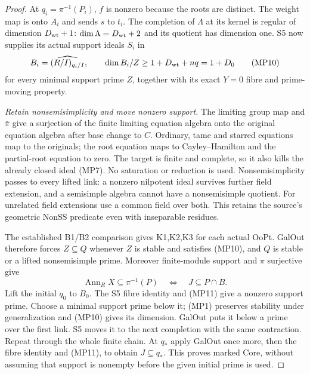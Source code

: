 \begin{proof}
At $q_i=\pi^{-1}(P_i)$, $f$ is nonzero because the roots are distinct.
The weight map is onto $A_i$ and sends $s$ to $t_i$.  The completion of
$\Lambda$ at its kernel is regular of dimension $D_{\rm wt}+1$:
$\dim\Lambda=D_{\rm wt}+2$ and its quotient has dimension one.
S5 now supplies its actual support ideals $S_i$ in
\[
 B_i=\widehat{(R/I)_{q_i/I}},\qquad
 \dim B_i/Z\ge 1+D_{\rm wt}+nq=1+D_0                         \tag{MP10}
\]
for every minimal support prime $Z$, together with its exact $Y=0$
fibre and prime-moving property.

\emph{Retain nonsemisimplicity and move nonzero support.}
The limiting group map and $\bar\pi$ give a surjection of the finite
limiting equation algebra onto the original equation algebra after
base change to $C$.  Ordinary, tame and starred equations map to the
originals; the root equation maps to Cayley--Hamilton and the
partial-root equation to zero.  The target is finite and complete,
so it also kills the already closed ideal (MP7).  No saturation or
reduction is used.  Nonsemisimplicity passes to every lifted link:
a nonzero nilpotent ideal survives further field extension, and a
semisimple algebra cannot have a nonsemisimple quotient.  For unrelated
field extensions use a common field over both.  This retains the
source's geometric NonSS predicate even with inseparable residues.

The established B1/B2 comparison gives K1,K2,K3 for each actual OoPt.
GalOut therefore forces $Z\subseteq Q$ whenever $Z$ is stable and
satisfies (MP10), and $Q$ is stable or a lifted nonsemisimple prime.
Moreover finite-module support and $\pi$ surjective give
\[
 \operatorname{Ann}_RX\subseteq\pi^{-1}(P)
                   \quad\Longleftrightarrow\quad J\subseteq P\cap B.
                                                               \tag{MP11}
\]
Lift the initial $q_0$ to $B_0$.  The S5 fibre identity and (MP11)
give a nonzero support prime.  Choose a minimal support prime below
it; (MP1) preserves stability under generalization and (MP10) gives
its dimension.  GalOut puts it below a prime over the first link.
S5 moves it to the next completion with the same contraction.
Repeat through the whole finite chain.  At $q_*$ apply GalOut once
more, then the fibre identity and (MP11), to obtain $J\subseteq q_*$.
This proves marked Core, without assuming that support is nonempty
before the given initial prime is used.


\end{proof}

